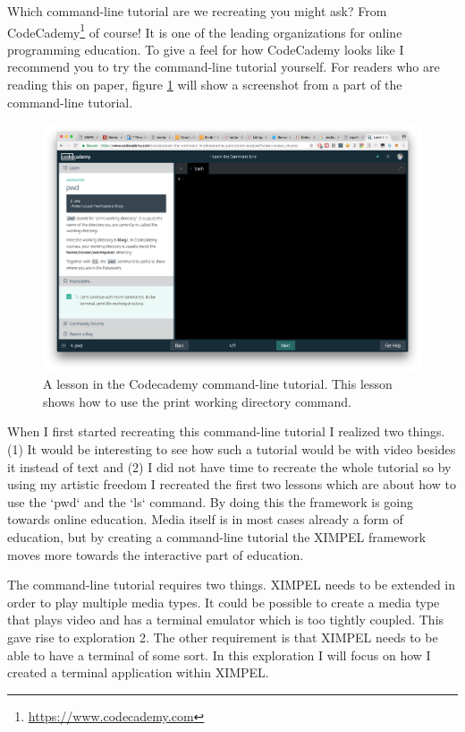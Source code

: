 Which command-line tutorial are we recreating you might ask? From CodeCademy\footnote{\hyperlink{https://www.codecademy.com}{https://www.codecademy.com}} of course! It is one of the leading organizations for online programming education. To give a feel for how CodeCademy looks like I recommend you to try the command-line tutorial yourself. For readers who are reading this on paper, figure \ref{fig:codecademy} will show a screenshot from a part of the command-line tutorial.

\begin{figure}
    \centering
    \includegraphics[width=1.35\textwidth, center]{codecademy_example.png} %
    \caption{A lesson in the Codecademy command-line tutorial. This lesson shows how to use the print working directory command.}
    \label{fig:codecademy}
\end{figure}

When I first started recreating this command-line tutorial I realized two things. (1) It would be interesting to see how such a tutorial would be with video besides it instead of text and (2) I did not have time to recreate the whole tutorial so by using my artistic freedom I recreated the first two lessons which are about how to use the `pwd` and the `ls` command. By doing this the framework is going towards online education. Media itself is in most cases already a form of education, but by creating a command-line tutorial the XIMPEL framework moves more towards the interactive part of education. 

The command-line tutorial requires two things. XIMPEL needs to be extended in order to play multiple media types. It could be possible to create a media type that plays video and has a terminal emulator which is too tightly coupled. This gave rise to exploration 2. The other requirement is that XIMPEL needs to be able to have a terminal of some sort. In this exploration I will focus on how I created a terminal application within XIMPEL.

